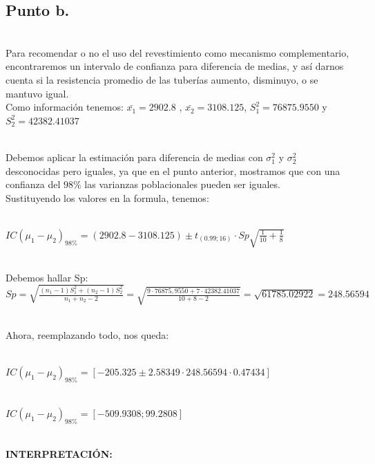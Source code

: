 \documentclass[letterpaper,12pt,onecolumn,titlepage]{article}
\begin{document}
\subsection{Punto b.}
~\\ Para recomendar o no el uso del revestimiento como mecanismo complementario, encontraremos un intervalo de confianza para diferencia de medias, y as\'{i} darnos cuenta si la resistencia promedio de las tuber\'{i}as aumento, disminuyo, o se mantuvo igual.
~\\ Como informaci\'{o}n tenemos: $\bar{x_1}=2902.8$ , $\bar{x_2}=3108.125$, $S_{1}^2=76875.9550$ y $S_{2}^2=42382.41037$

~\\ Debemos aplicar la estimaci\'{o}n para diferencia de medias con $\sigma_{1}^2$ y $\sigma_{2}^2$ desconocidas pero iguales, ya que en el punto anterior, mostramos que con una confianza del $98\%$ las varianzas poblacionales pueden ser iguales.
~\\ Sustituyendo los valores en la formula, tenemos:

~\\ $IC(\mu_1 - \mu_2)_{98\%}=(2902.8-3108.125)\pm t_{(0.99;16)}\cdot Sp\sqrt{\frac{1}{10}+\frac{1}{8}}$ 

~\\ Debemos hallar Sp:
~\\ $Sp=\sqrt{\frac{(n_{1}-1)S_{1}^2+(n_{2}-1)S_{2}^2}{n_{1}+n_{2}-2}}=\sqrt{\frac{9\cdot76875,9550+7\cdot42382.41037}{10+8-2}}=\sqrt{61785.02922}=248.56594$

~\\ Ahora, reemplazando todo, nos queda:

~\\ $IC(\mu_1 - \mu_2)_{98\%}=[-205.325 \pm 2.58349 \cdot 248.56594 \cdot 0.47434]$

~\\ $IC(\mu_1 - \mu_2)_{98\%}=[-509.9308 ; 99.2808]$

\pagebreak
~\\ \textbf{INTERPRETACI\'{O}N:}
\end{document}
